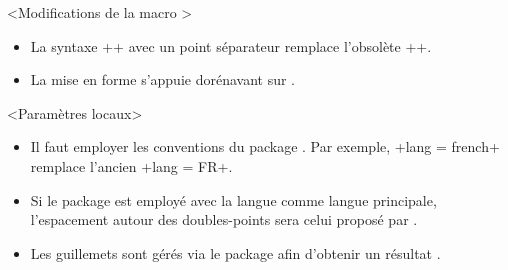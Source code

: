 

\begin{bdoctopic}<Modifications de la macro >
    \begin{itemize}
        \item La syntaxe \bdocinlatex++ avec un point séparateur remplace l'obsolète \bdocinlatex++.

        \item La mise en forme s'appuie dorénavant sur .
    \end{itemize}
\end{bdoctopic}




\begin{bdoctopic}<Paramètres locaux>
    \begin{itemize}
        \item Il faut employer les conventions  du package .
        Par exemple, \bdocinlatex+lang = french+ remplace l'ancien \bdocinlatex+lang = FR+.

        \item Si le package  est employé avec la langue  comme langue principale, l'espacement autour des doubles-points sera celui proposé par .

        \item Les guillemets sont gérés via le package  afin d'obtenir un résultat .
    \end{itemize}
\end{bdoctopic}
